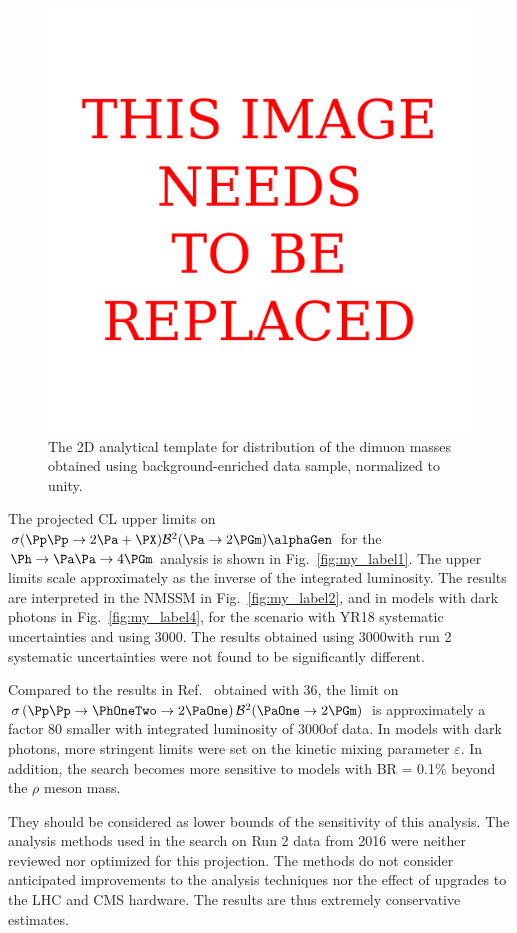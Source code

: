 \begin{figure}[tb]
\begin{center}
\includegraphics[width=0.52\linewidth]{section9/cms_higgs2a4mu/plots/h2_background}
\end{center}
\caption{The 2D analytical template for distribution of the dimuon masses obtained using background-enriched data sample, normalized to unity. \label{fig:2dtemplate}}
\end{figure}

The projected CL upper limits on ${\sigma(\Pp\Pp \to 2 \Pa + \PX)  \mathcal{B}^2 (\Pa \to 2\PGm)  \alphaGen}$ for the $\Ph\to\Pa\Pa\to4\PGm$ analysis is shown in Fig.~\ref{fig:my_label1}. The upper limits scale approximately as the inverse of the integrated luminosity. The results are interpreted in the NMSSM in Fig.~\ref{fig:my_label2}, and in models with dark photons in Fig.~\ref{fig:my_label4}, for the scenario with YR18 systematic uncertainties and using 3000\Uifb. The results obtained using 3000\Uifb with run 2 systematic uncertainties were not found to be significantly different.

Compared to the results in Ref.~\cite{CMS-PAS-HIG-18-003} obtained with 36\Uifb, the limit on $\sigma \left( \Pp\Pp \to \PhOneTwo \to 2 \PaOne \right) \mathcal{B}^2(\PaOne \to 2\PGm)$ is approximately a factor 80 smaller with integrated luminosity of 3000\Uifb of data. In models with dark photons, more stringent limits were set on the kinetic mixing parameter $\varepsilon$. In addition, the search becomes more sensitive to models with BR = 0.1\% beyond the $\rho$ meson mass.

They should be considered as lower bounds of the sensitivity of this analysis. The analysis methods used in the search on Run 2 data from 2016 were neither reviewed nor optimized for this projection. The methods do not consider anticipated improvements to the analysis techniques nor the effect of upgrades to the LHC and CMS hardware. The results are thus extremely conservative estimates.

